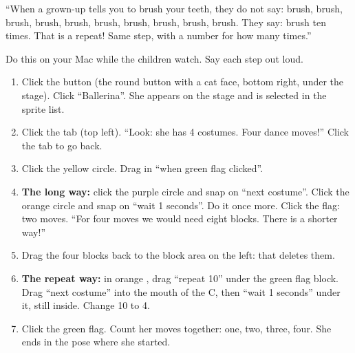 \begin{analogy}
\enquote{When a grown-up tells you to brush your teeth, they do not say: brush, brush, brush, brush, brush, brush, brush, brush, brush, brush. They say: brush ten times. That is a repeat! Same step, with a number for how many times.}
\end{analogy}

\begin{workedexample}
Do this on your Mac while the children watch. Say each step out loud.
\begin{enumerate}[leftmargin=1.4em,itemsep=1pt]
  \item Click the  button (the round button with a cat face, bottom right, under the stage). Click \enquote{Ballerina}. She appears on the stage and is selected in the sprite list.
  \item Click the  tab (top left). \enquote{Look: she has 4 costumes. Four dance moves!} Click the  tab to go back.
  \item Click the yellow  circle. Drag in \enquote{when green flag clicked}.
  \item \textbf{The long way:} click the purple  circle and snap on \enquote{next costume}. Click the orange  circle and snap on \enquote{wait 1 seconds}. Do it once more. Click the flag: two moves. \enquote{For four moves we would need eight blocks. There is a shorter way!}
  \item Drag the four blocks back to the block area on the left: that deletes them.
  \item \textbf{The repeat way:} in orange , drag \enquote{repeat 10} under the green flag block. Drag \enquote{next costume} into the mouth of the C, then \enquote{wait 1 seconds} under it, still inside. Change 10 to 4.
  \item Click the green flag. Count her moves together: one, two, three, four. She ends in the pose where she started.
\end{enumerate}
\begin{center}
\begin{scratch}[scale=0.85]
\end{scratch}
\end{center}
\end{workedexample}

